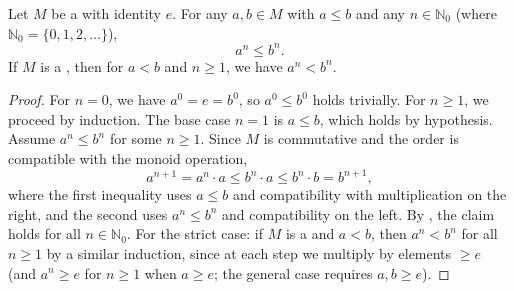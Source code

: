\begin{proposition} \label{proposition:natural_number_powers_preserve_order_in_ordered_monoid}
    Let $M$ be a  with identity $e$. For any $a,b \in M$ with $a \le b$ and any $n \in \mathbb{N}_0$ (where $\mathbb{N}_0 = \{0,1,2,\dots\}$),
    $$a^n \le b^n.$$
    If $M$ is a , then for $a < b$ and $n \ge 1$, we have $a^n < b^n$.
\end{proposition}
\begin{proof}
    For $n=0$, we have $a^0 = e = b^0$, so $a^0 \le b^0$ holds trivially. For $n \ge 1$, we proceed by induction. The base case $n=1$ is $a \le b$, which holds by hypothesis. Assume $a^n \le b^n$ for some $n \ge 1$. Since $M$ is commutative and the order is compatible with the monoid operation,
    $$a^{n+1} = a^n \cdot a \le b^n \cdot a \le b^n \cdot b = b^{n+1},$$
    where the first inequality uses $a \le b$ and compatibility with multiplication on the right, and the second uses $a^n \le b^n$ and compatibility on the left. By , the claim holds for all $n \in \mathbb{N}_0$.
    For the strict case: if $M$ is a  and $a < b$, then $a^n < b^n$ for all $n \ge 1$ by a similar induction, since at each step we multiply by elements $\ge e$ (and $a^n \ge e$ for $n \ge 1$ when $a \ge e$; the general case requires $a,b \ge e$).
\end{proof}